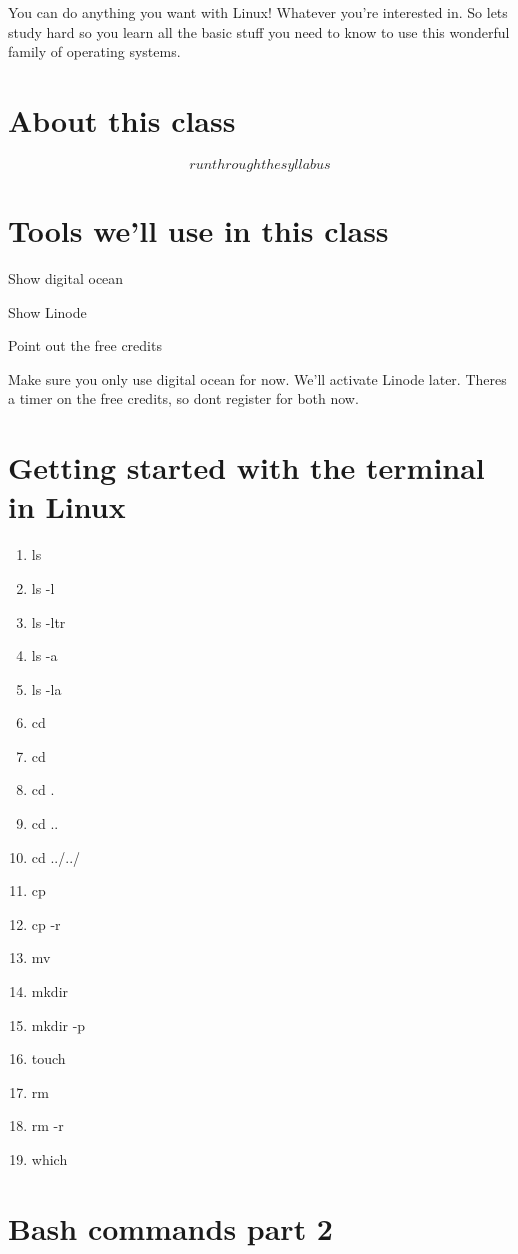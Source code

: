 \documentclass[10pt]{article}
\begin{document}
You can do anything you want with Linux! Whatever you're interested in. So lets
study hard so you learn all the basic stuff you need to know to use this
wonderful family of operating systems.

\section{ About this class}
\[ run through the syllabus \]

\section{Tools we'll use in this class}
Show digital ocean

Show Linode

Point out the free credits

Make sure you only use digital ocean for now. We'll activate Linode later.
Theres a timer on the free credits, so dont register for both now.

\section{Getting started with the terminal in Linux}
\begin{multicols}{4}
\begin{enumerate}
\item ls
\item ls -l
\item ls -ltr
\item ls -a
\item ls -la
\item cd $~$
\item cd
\item cd .
\item cd ..
\item cd ../../
\item cp
\item cp -r
\item mv
\item mkdir
\item mkdir -p
\item touch
\item rm 
\item rm -r
\item which 
\end{enumerate}
\end{multicols}

\section{Bash commands part 2}
\end{document}
